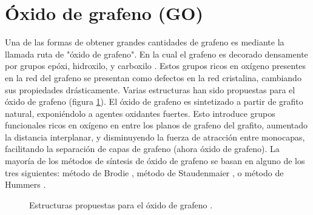 \section{Óxido de grafeno (GO)}
Una de las formas de obtener grandes cantidades de grafeno es mediante la llamada ruta de "óxido de grafeno". En la cual el grafeno es decorado densamente por grupos epóxi, hidroxilo, y carboxilo \citep{Dreyer2010}. Estos grupos ricos en oxígeno presentes en la red del grafeno se presentan como defectos en la red cristalina, cambiando sus propiedades drásticamente. Varias estructuras han sido propuestas para el óxido de grafeno (figura \ref{fig:GO_structure}).
El óxido de grafeno es sintetizado a partir de grafito natural, exponiéndolo a agentes oxidantes fuertes. Esto introduce grupos funcionales ricos en oxígeno en entre los planos de grafeno del grafito, aumentado la distancia interplanar, y disminuyendo la fuerza de atracción entre monocapas, facilitando la separación de capas de grafeno (ahora óxido de grafeno). La mayoría de los métodos de síntesis de óxido de grafeno se basan en alguno de los tres siguientes: método de Brodie \citep{Brodie1859}, método de Staudenmaier \citep{Staudenmaier1898}, o método de Hummers \citep{Hummers1958}.

\begin{figure}
	\centering
	\caption{Estructuras propuestas para el óxido de grafeno \citep{Dreyer2010}.}
	\label{fig:GO_structure}
\end{figure}


